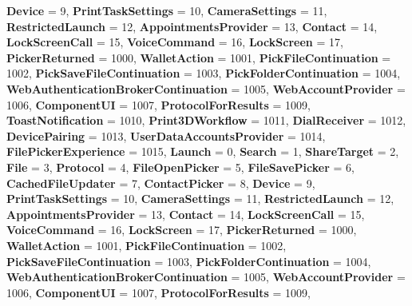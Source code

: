 \begin{DoxyCompactItemize}
{\bfseries Device} = 9, 
{\bfseries Print\+Task\+Settings} = 10, 
\newline
{\bfseries Camera\+Settings} = 11, 
{\bfseries Restricted\+Launch} = 12, 
{\bfseries Appointments\+Provider} = 13, 
{\bfseries Contact} = 14, 
\newline
{\bfseries Lock\+Screen\+Call} = 15, 
{\bfseries Voice\+Command} = 16, 
{\bfseries Lock\+Screen} = 17, 
{\bfseries Picker\+Returned} = 1000, 
\newline
{\bfseries Wallet\+Action} = 1001, 
{\bfseries Pick\+File\+Continuation} = 1002, 
{\bfseries Pick\+Save\+File\+Continuation} = 1003, 
{\bfseries Pick\+Folder\+Continuation} = 1004, 
\newline
{\bfseries Web\+Authentication\+Broker\+Continuation} = 1005, 
{\bfseries Web\+Account\+Provider} = 1006, 
{\bfseries Component\+UI} = 1007, 
{\bfseries Protocol\+For\+Results} = 1009, 
\newline
{\bfseries Toast\+Notification} = 1010, 
{\bfseries Print3\+D\+Workflow} = 1011, 
{\bfseries Dial\+Receiver} = 1012, 
{\bfseries Device\+Pairing} = 1013, 
\newline
{\bfseries User\+Data\+Accounts\+Provider} = 1014, 
{\bfseries File\+Picker\+Experience} = 1015, 
{\bfseries Launch} = 0, 
{\bfseries Search} = 1, 
\newline
{\bfseries Share\+Target} = 2, 
{\bfseries File} = 3, 
{\bfseries Protocol} = 4, 
{\bfseries File\+Open\+Picker} = 5, 
\newline
{\bfseries File\+Save\+Picker} = 6, 
{\bfseries Cached\+File\+Updater} = 7, 
{\bfseries Contact\+Picker} = 8, 
{\bfseries Device} = 9, 
\newline
{\bfseries Print\+Task\+Settings} = 10, 
{\bfseries Camera\+Settings} = 11, 
{\bfseries Restricted\+Launch} = 12, 
{\bfseries Appointments\+Provider} = 13, 
\newline
{\bfseries Contact} = 14, 
{\bfseries Lock\+Screen\+Call} = 15, 
{\bfseries Voice\+Command} = 16, 
{\bfseries Lock\+Screen} = 17, 
\newline
{\bfseries Picker\+Returned} = 1000, 
{\bfseries Wallet\+Action} = 1001, 
{\bfseries Pick\+File\+Continuation} = 1002, 
{\bfseries Pick\+Save\+File\+Continuation} = 1003, 
\newline
{\bfseries Pick\+Folder\+Continuation} = 1004, 
{\bfseries Web\+Authentication\+Broker\+Continuation} = 1005, 
{\bfseries Web\+Account\+Provider} = 1006, 
{\bfseries Component\+UI} = 1007, 
\newline
{\bfseries Protocol\+For\+Results} = 1009, 

\end{DoxyCompactItemize}
